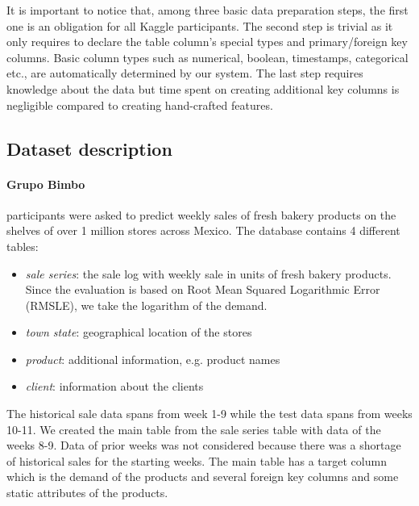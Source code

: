 It is important to notice that, among three basic data preparation steps, the first one is an obligation for all Kaggle participants.  The second step is trivial as it only requires to declare the table column's special types and primary/foreign key columns. Basic column types such as numerical, boolean, timestamps, categorical etc.,  are automatically determined by our system. The last step requires  knowledge about the data but time spent on creating additional key columns is negligible compared to creating hand-crafted features.
  
\subsection{Dataset description}
\paragraph{Grupo Bimbo} participants were asked to predict weekly sales of fresh bakery products on the shelves of over 1 million stores across Mexico. The database contains 4 different tables:
\begin{itemize}
\item \textit{sale series}: the sale log with weekly sale in units of fresh bakery products. Since the evaluation is based on Root Mean Squared Logarithmic Error (RMSLE), we take the logarithm of the demand.
\item \textit{town state}: geographical location of the stores
\item \textit{product}: additional information, e.g. product names
\item \textit{client}: information about the clients
\end{itemize} 
The historical sale data spans from week 1-9 while the test data spans from weeks 10-11. We created the main table from the sale series table with data of the weeks 8-9. Data of prior weeks was not considered because there was a shortage of historical sales for the starting weeks. The main table has a target column which is the demand of the products and several foreign key columns and some static attributes of the products. 

